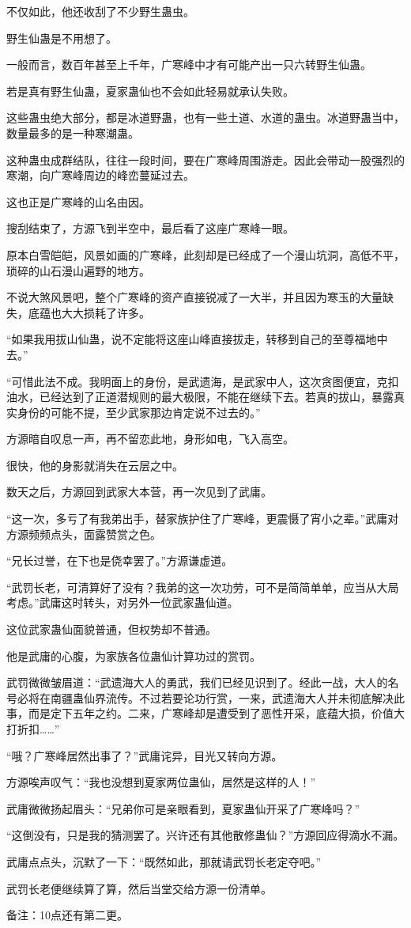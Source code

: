 \begin{this_body}
不仅如此，他还收刮了不少野生蛊虫。

野生仙蛊是不用想了。

一般而言，数百年甚至上千年，广寒峰中才有可能产出一只六转野生仙蛊。

若是真有野生仙蛊，夏家蛊仙也不会如此轻易就承认失败。

这些蛊虫绝大部分，都是冰道野蛊，也有一些土道、水道的蛊虫。冰道野蛊当中，数量最多的是一种寒潮蛊。

这种蛊虫成群结队，往往一段时间，要在广寒峰周围游走。因此会带动一股强烈的寒潮，向广寒峰周边的峰峦蔓延过去。

这也正是广寒峰的山名由因。

搜刮结束了，方源飞到半空中，最后看了这座广寒峰一眼。

原本白雪皑皑，风景如画的广寒峰，此刻却是已经成了一个漫山坑洞，高低不平，琐碎的山石漫山遍野的地方。

不说大煞风景吧，整个广寒峰的资产直接锐减了一大半，并且因为寒玉的大量缺失，底蕴也大大损耗了许多。

“如果我用拔山仙蛊，说不定能将这座山峰直接拔走，转移到自己的至尊福地中去。”

“可惜此法不成。我明面上的身份，是武遗海，是武家中人，这次贪图便宜，克扣油水，已经达到了正道潜规则的最大极限，不能在继续下去。若真的拔山，暴露真实身份的可能不提，至少武家那边肯定说不过去的。”

方源暗自叹息一声，再不留恋此地，身形如电，飞入高空。

很快，他的身影就消失在云层之中。

数天之后，方源回到武家大本营，再一次见到了武庸。

“这一次，多亏了有我弟出手，替家族护住了广寒峰，更震慑了宵小之辈。”武庸对方源频频点头，面露赞赏之色。

“兄长过誉，在下也是侥幸罢了。”方源谦虚道。

“武罚长老，可清算好了没有？我弟的这一次功劳，可不是简简单单，应当从大局考虑。”武庸这时转头，对另外一位武家蛊仙道。

这位武家蛊仙面貌普通，但权势却不普通。

他是武庸的心腹，为家族各位蛊仙计算功过的赏罚。

武罚微微皱眉道：“武遗海大人的勇武，我们已经见识到了。经此一战，大人的名号必将在南疆蛊仙界流传。不过若要论功行赏，一来，武遗海大人并未彻底解决此事，而是定下五年之约。二来，广寒峰却是遭受到了恶性开采，底蕴大损，价值大打折扣……”

“哦？广寒峰居然出事了？”武庸诧异，目光又转向方源。

方源唉声叹气：“我也没想到夏家两位蛊仙，居然是这样的人！”

武庸微微扬起眉头：“兄弟你可是亲眼看到，夏家蛊仙开采了广寒峰吗？”

“这倒没有，只是我的猜测罢了。兴许还有其他散修蛊仙？”方源回应得滴水不漏。

武庸点点头，沉默了一下：“既然如此，那就请武罚长老定夺吧。”

武罚长老便继续算了算，然后当堂交给方源一份清单。

备注：10点还有第二更。

\end{this_body}

